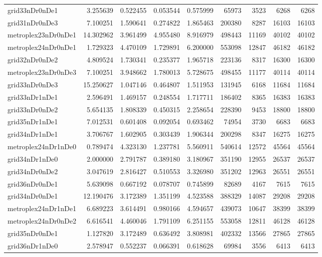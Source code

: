 \begin{longtable}{|l|r|r|r|r|r|r|r|r|}
grid33nDr0nDe1 & 3.255639 & 0.522455 & 0.053544 & 0.575999 & 65973 & 3523 & 6268 & 6268 \\
grid31nDr0nDe3 & 7.100251 & 1.590641 & 0.274822 & 1.865463 & 200380 & 8287 & 16103 & 16103 \\
metroplex23nDr0nDe1 & 14.302962 & 3.961499 & 4.955480 & 8.916979 & 498443 & 11169 & 40102 & 40102 \\
metroplex24nDr0nDe1 & 1.729323 & 4.470109 & 1.729891 & 6.200000 & 553098 & 12847 & 46182 & 46182 \\
grid32nDr0nDe2 & 4.809524 & 1.730341 & 0.235377 & 1.965718 & 223136 & 8317 & 16300 & 16300 \\
metroplex23nDr0nDe3 & 7.100251 & 3.948662 & 1.780013 & 5.728675 & 498455 & 11177 & 40114 & 40114 \\
grid33nDr0nDe3 & 15.250627 & 1.047146 & 0.464807 & 1.511953 & 131945 & 6168 & 11684 & 11684 \\
grid33nDr1nDe1 & 2.596491 & 1.469157 & 0.248554 & 1.717711 & 186402 & 8365 & 16383 & 16383 \\
grid33nDr0nDe2 & 5.654135 & 1.808339 & 0.450315 & 2.258654 & 228390 & 9453 & 18800 & 18800 \\
grid35nDr1nDe1 & 7.012531 & 0.601408 & 0.092054 & 0.693462 & 74954 & 3730 & 6683 & 6683 \\
grid34nDr1nDe1 & 3.706767 & 1.602905 & 0.303439 & 1.906344 & 200298 & 8347 & 16275 & 16275 \\
metroplex24nDr1nDe0 & 0.789474 & 4.323130 & 1.237781 & 5.560911 & 540614 & 12572 & 45564 & 45564 \\
grid34nDr1nDe0 & 2.000000 & 2.791787 & 0.389180 & 3.180967 & 351190 & 12955 & 26537 & 26537 \\
grid34nDr0nDe2 & 3.047619 & 2.816427 & 0.510553 & 3.326980 & 351202 & 12963 & 26551 & 26551 \\
grid36nDr0nDe1 & 5.639098 & 0.667192 & 0.078707 & 0.745899 & 82689 & 4167 & 7615 & 7615 \\
grid34nDr0nDe1 & 12.190476 & 3.172389 & 1.351199 & 4.523588 & 388329 & 14087 & 29208 & 29208 \\
metroplex24nDr1nDe1 & 6.689223 & 3.614491 & 0.980166 & 4.594657 & 439073 & 10647 & 38399 & 38399 \\
metroplex24nDr0nDe2 & 6.616541 & 4.460046 & 1.791109 & 6.251155 & 553058 & 12811 & 46128 & 46128 \\
grid35nDr0nDe1 & 1.127820 & 3.172489 & 0.636492 & 3.808981 & 402332 & 13566 & 27865 & 27865 \\
grid36nDr1nDe0 & 2.578947 & 0.552237 & 0.066391 & 0.618628 & 69984 & 3556 & 6413 & 6413 \\

\end{longtable}
